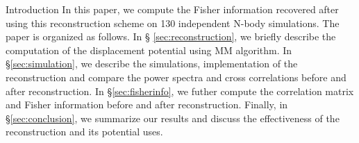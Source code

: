 \begin{section}{Introduction}
  In this paper, we compute the Fisher information recovered after
  using this reconstruction scheme on 130 independent N-body
  simulations.  The paper is organized as follows.  In \S
  \ref{sec:reconstruction}, we briefly
  describe the computation of the displacement potential using MM
  algorithm. In \S \ref{sec:simulation}, we describe  
  the simulations, implementation of the reconstruction and compare 
  the power spectra and cross correlations before and after reconstruction.  
  In \S \ref{sec:fisherinfo}, we futher compute the correlation matrix 
  and Fisher information before and
  after reconstruction.  Finally, in \S \ref{sec:conclusion}, we summarize 
  our results and 
  discuss the effectiveness of the reconstruction and its potential
  uses.


\end{section}

